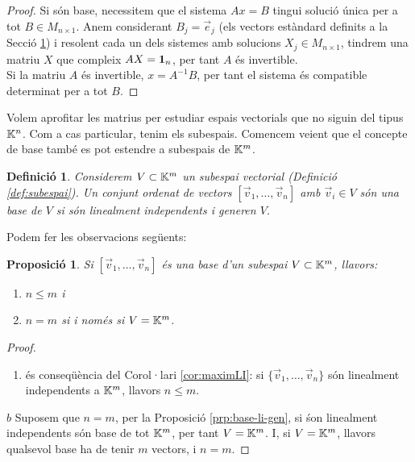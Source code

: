 \documentclass[
  11pt,
]{book}
\providecommand{\tightlist}{%
  \setlength{\itemsep}{0pt}\setlength{\parskip}{0pt}}
\numberwithin{dummy}{section}
\theoremstyle{maincolornumbox}
\theoremstyle{blacknumex}
\theoremstyle{blacknumbox}
\newtheorem{definitionT}{Definició}[chapter]
\theoremstyle{maincolornum}
\newtheorem{propositionT}{Proposició}[chapter]
\newenvironment{proposition}{\begin{pBox}\begin{propositionT}}{\end{propositionT}\end{pBox}}
\newenvironment{definition}{\begin{dBox}\begin{definitionT}}{\end{definitionT}\end{dBox}}
\newlength\esp
\begin{document}
\begin{proof}
Si són base, necessitem que el sistema \(Ax=B\) tingui solució
única per a tot \(B\in M_{n\times 1}\). Anem considerant \(B_j=\vec e_j\)
(els vectors estàndard definits a la Secció
\hyperref[subsec:matriusapl]{1}) i resolent cada un dels sistemes amb
solucions \(X_j\in M_{n\times 1}\), tindrem una matriu \(X\) que compleix
\(AX=\mathbf{1}_n\), per tant \(A\) és invertible.\\
Si la matriu \(A\) és invertible, \(x=A^{-1}B\), per tant el sistema és
compatible determinat per a tot \(B\).
\end{proof}

Volem aprofitar les matrius per estudiar espais vectorials que no siguin
del tipus \(\mathbb{K}^n\). Com a cas particular, tenim els subespais. Comencem
veient que el concepte de base també es pot estendre a subespais de
\(\mathbb{K}^m\).

\begin{definition}
Considerem \(V\subset \mathbb{K}^m\) un subespai vectorial (Definició
\ref{def:subespai}). Un conjunt ordenat de vectors
\([\vec v_1, \dots, \vec v_n]\) amb \(\vec v_i \in V\) són \emph{una base de \(V\)}
si són linealment independents i generen \(V\).
\end{definition}

Podem fer les observacions següents:

\begin{proposition}

Si \([\vec v_1, \dots, \vec v_n]\) és una base d'un subespai
\(V\subset \mathbb{K}^m\), llavors:

\begin{enumerate}
\def\labelenumi{\arabic{enumi}.}
\item
  \(n\leq m\) i
\item
  \(n=m\) si i només si \(V=\mathbb{K}^m\).
\end{enumerate}

\end{proposition}

\begin{proof}
\leavevmode

\begin{enumerate}
\def\labelenumi{(\alph{enumi})}
\tightlist
\item
  és conseqüència del Corol·lari
  \ref{cor:maximLI}: si \(\{ \vec v_1, \dots, \vec v_n \}\) són
  linealment independents a \(\mathbb{K}^m\), llavors \(n\leq m\).
\end{enumerate}

\(b\) Suposem que \(n=m\), per la Proposició
\ref{prp:base-li-gen}, si śon linealment independents són base
de tot \(\mathbb{K}^m\), per tant \(V=\mathbb{K}^m\). I, si \(V=\mathbb{K}^m\), llavors qualsevol base
ha de tenir \(m\) vectors, i \(n=m\).

\end{proof}
\end{document}
